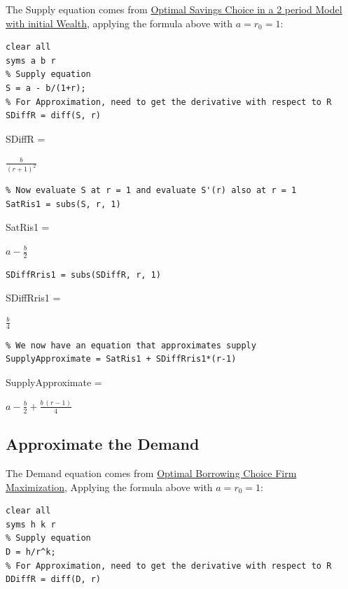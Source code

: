 \documentclass[
]{book}
\begin{document}
The Supply equation comes from \href{https://math4econ.github.io/derivative_application/K_save_households.html}{Optimal Savings Choice in a 2 period
Model with initial
Wealth},
applying the formula above with \(a=r_0 =1\):

\begin{verbatim}
clear all
syms a b r
% Supply equation
S = a - b/(1+r);
% For Approximation, need to get the derivative with respect to R
SDiffR = diff(S, r)
\end{verbatim}

SDiffR =

\(\displaystyle \frac{b}{{{\left(r+1\right)}}^2 }\)

\begin{verbatim}
% Now evaluate S at r = 1 and evaluate S'(r) also at r = 1
SatRis1 = subs(S, r, 1)
\end{verbatim}

SatRis1 =

\(\displaystyle a-\frac{b}{2}\)

\begin{verbatim}
SDiffRris1 = subs(SDiffR, r, 1)
\end{verbatim}

SDiffRris1 =

\(\displaystyle \frac{b}{4}\)

\begin{verbatim}
% We now have an equation that approximates supply
SupplyApproximate = SatRis1 + SDiffRris1*(r-1)
\end{verbatim}

SupplyApproximate =

\(\displaystyle a-\frac{b}{2}+\frac{b\,{\left(r-1\right)}}{4}\)

\hypertarget{approximate-the-demand}{%
\subsection{Approximate the Demand}\label{approximate-the-demand}}

The Demand equation comes from \href{https://math4econ.github.io/derivative_application/K_borrow_firm.html}{Optimal Borrowing Choice Firm
Maximization},
Applying the formula above with \(a=r_0 =1\):

\begin{verbatim}
clear all
syms h k r
% Supply equation
D = h/r^k;
% For Approximation, need to get the derivative with respect to R
DDiffR = diff(D, r)
\end{verbatim}
\end{document}
